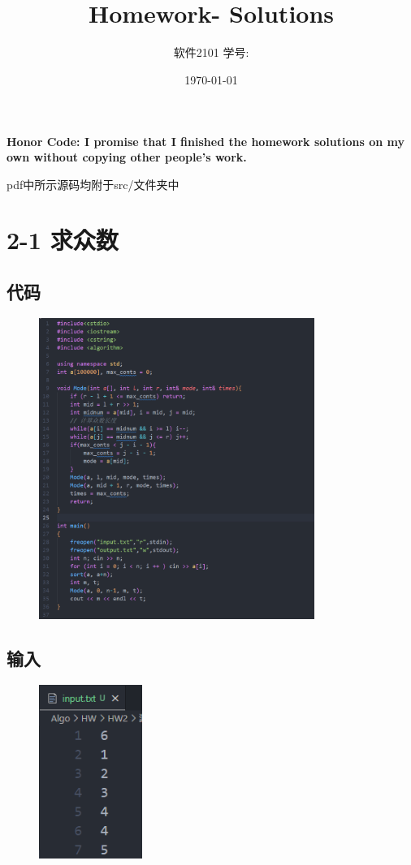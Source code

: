 \documentclass[11pt]{article}  %
\title{\vspace{-4cm}\CourseCodeName \space
        \Session \protect\\  Homework-\textbf{\Homework} Solutions}
\author{软件2101 \Name \space 学号: \SID}
\date{\today}
\begin{document}
\maketitle

\textbf{Honor Code: I promise that I finished the homework solutions on my own without copying other people's 
    work.}

pdf中所示源码均附于src/文件夹中

\section*{2-1 求众数}

\subsection*{代码}

    \begin{figure}[H]
        \centering
        \includegraphics[width = 0.8\textwidth]{pic/2-1src.png}
    \end{figure}

\subsection*{输入}

    \begin{figure}[H]
        \centering
        \includegraphics[width = 0.3\textwidth]{pic/2-1input.png}
    \end{figure}
\end{document}
